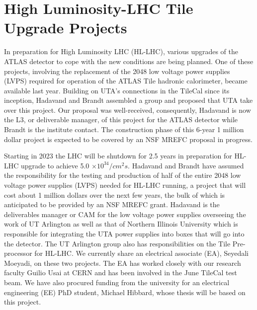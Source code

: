 \section{High Luminosity-LHC Tile Upgrade Projects}
\label{sec:Tile-HL-LHC}
In preparation for High Luminosity LHC (HL-LHC), various upgrades of the ATLAS detector to cope with the new conditions are being planned. One of these projects, involving the replacement of the 2048 low voltage power supplies (LVPS) 
required for operation of the ATLAS Tile hadronic calorimeter, became available last year.  
Building on UTA's connections in the TileCal since its inception, Hadavand and Brandt assembled a group and proposed that UTA take over this project. 
Our proposal was well-received, consequently, Hadavand is now the L3, or deliverable manager, of this project for the ATLAS detector while Brandt is the institute contact. The construction phase of this 6-year 
1 million dollar project is expected to be covered by an NSF MREFC proposal in progress. 

Starting in 2023 the LHC will be shutdown for 2.5 years in preparation for HL-LHC upgrade to achieve 5.0 $\times 10^{34}/cm^2s$. 
Hadavand and Brandt have assumed the responsibility for the testing and production of half of the entire 2048 low voltage power supplies (LVPS) needed for HL-LHC running, 
a project that will cost about 1 million dollars over the next few years, the bulk of which is anticipated to be provided by an NSF MREFC grant. 
Hadavand is the deliverables manager or CAM for the low voltage 
power supplies overseeing the work of UT Arlington as well as that of Northern Illinois University which is responsible for integrating the UTA power supplies into boxes that will go into the detector.
The UT Arlington group also has responsibilities on the Tile Pre-processor for HL-LHC.  We currently
share an electrical associate (EA), Seyedali Moeyadi, on these two projects.  The EA has worked closely with our research faculty Guilio Usai at CERN and has been involved in the June TileCal test beam.  We have also procured
funding from the university for an electrical engineering (EE) PhD student, Michael Hibbard, whose thesis will be based on this project.  

